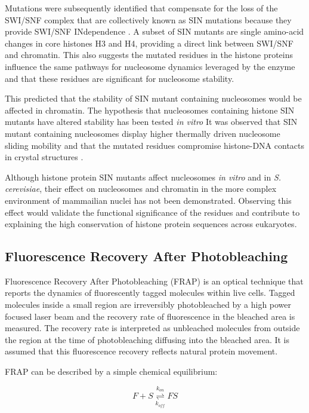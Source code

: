    Mutations were subsequently identified that compensate for the loss of the SWI/SNF complex
    that are collectively known as SIN mutations because they provide SWI/SNF INdependence .
    A subset of SIN mutants are single amino-acid changes in core histones H3 and H4,
    providing a direct link between SWI/SNF and chromatin.
    This also suggests the mutated residues in the histone proteins 
    influence the same pathways for nucleosome dynamics leveraged by the enzyme 
    and that these residues are significant for nucleosome stability.

    This predicted that the stability of SIN mutant containing nucleosomes would be affected in chromatin.
    The hypothesis that nucleosomes containing histone SIN mutants
    have altered stability has been tested \textit{in vitro}
    It was observed that SIN mutant containing nucleosomes display higher 
    thermally driven nucleosome sliding mobility \citep{flaus2004sin}
    and that the mutated residues compromise histone-DNA contacts in crystal structures .

    Although histone protein SIN mutants affect nucleosomes \textit{in vitro} and in \textit{S. cerevisiae},
    their effect on nucleosomes and chromatin in the more complex environment 
    of mammailian nuclei has not been demonstrated.
    Observing this effect would validate the functional significance of the residues
    and contribute to explaining the high conservation of histone protein sequences across eukaryotes.

  \subsection{Fluorescence Recovery After Photobleaching}

    Fluorescence Recovery After Photobleaching (FRAP) is an optical technique
    that reports the dynamics of fluorescently tagged molecules within live cells.
    Tagged molecules inside a small region are irreversibly photobleached by
    a high power focused laser beam and the recovery rate of fluorescence
    in the bleached area is measured. The recovery rate is interpreted as unbleached molecules
    from outside the region at the time of photobleaching diffusing into the bleached area.
    It is assumed that this fluorescence recovery reflects natural protein movement.

    FRAP can be described by a simple chemical equilibrium:

    \begin{displaymath}
      F + S \overset{k_{on}}{\underset{k_{off}}{\rightleftharpoons}} FS
    \end{displaymath}

